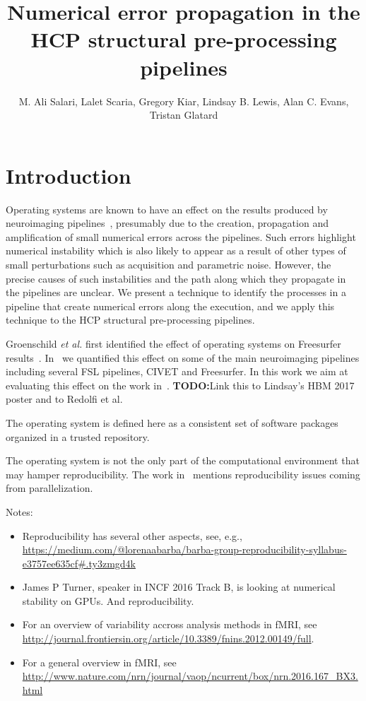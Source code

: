 \documentclass{article}
\title{Numerical error propagation in the HCP structural pre-processing pipelines}
\author{M. Ali Salari, Lalet Scaria, Gregory Kiar, Lindsay B. Lewis,
  Alan C. Evans, Tristan Glatard}
\newcommand{\todo}[1]{\color{red}\textbf{TODO:}#1\color{black}}
\begin{document}
\maketitle


\section{Introduction}

Operating systems are known to have an effect on the results produced
by neuroimaging pipelines~\cite{Gronenschild2012, Glatard2015},
presumably due to the creation, propagation and amplification of small
numerical errors across the pipelines.  Such errors highlight
numerical instability which is also likely to appear as a result of
other types of small perturbations such as acquisition and parametric
noise. However, the precise causes of
such instabilities and the path along which they propagate in the
pipelines are unclear.  We present a technique to identify the
processes in a pipeline that create numerical errors along the
execution, and we apply this technique to the HCP structural
pre-processing pipelines.


Groenschild \emph{et al.} first identified the effect of operating
systems on Freesurfer
results~\cite{Gronenschild2012}. In~\cite{10.3389/fninf.2015.00012} we
quantified this effect on some of the main neuroimaging pipelines
including several FSL pipelines, CIVET and Freesurfer. In this work we
aim at evaluating this effect on the work in~\cite{glasser2015multi}.
\todo{Link this to Lindsay's HBM 2017 poster and to Redolfi et al.}

The operating system is defined here as a consistent set of software
packages organized in a trusted repository.

The operating system is not the only part of the computational
environment that may hamper reproducibility. The work
in~\cite{diethelm2012limits} mentions reproducibility issues coming
from parallelization.

Notes:
\begin{itemize}
  \item Reproducibility has several other aspects, see, e.g.,
\url{https://medium.com/@lorenaabarba/barba-group-reproducibility-syllabus-e3757ee635cf#.ty3zmgd4k}
 \item James P Turner, speaker in INCF 2016 Track B, is looking at numerical stability on GPUs. And reproducibility.
 \item For an overview of variability accross analysis methods in fMRI, see \url{http://journal.frontiersin.org/article/10.3389/fnins.2012.00149/full}.
 \item For a general overview in fMRI, see \url{http://www.nature.com/nrn/journal/vaop/ncurrent/box/nrn.2016.167_BX3.html}
\end{itemize}
   
\end{document}
